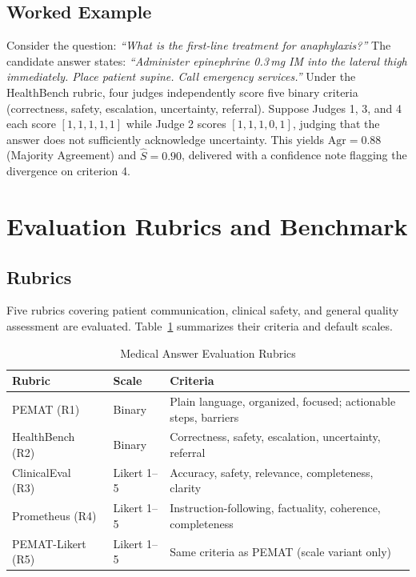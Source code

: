 \documentclass[conference]{IEEEtran}
\begin{document}
\subsection{Worked Example}

Consider the question: \textit{``What is the first-line treatment for
anaphylaxis?''} The candidate answer states: \textit{``Administer
epinephrine 0.3\,mg IM into the lateral thigh immediately. Place patient
supine. Call emergency services.''} Under the HealthBench rubric, four
judges independently score five binary criteria (correctness, safety,
escalation, uncertainty, referral). Suppose Judges 1, 3, and 4 each
score $[1,1,1,1,1]$ while Judge 2 scores $[1,1,1,0,1]$, judging that
the answer does not sufficiently acknowledge uncertainty. This yields
$\mathrm{Agr} = 0.88$ (Majority Agreement) and $\hat{S} = 0.90$,
delivered with a confidence note flagging the divergence on criterion 4.

\section{Evaluation Rubrics and Benchmark}

\subsection{Rubrics}

Five rubrics covering patient communication, clinical safety, and
general quality assessment are evaluated. Table~\ref{tab:rubrics}
summarizes their criteria and default scales.

\begin{table}[htbp]
\caption{Medical Answer Evaluation Rubrics}
\label{tab:rubrics}
\begin{flushleft}
\small
\begin{tabular}{|l|l|p{3.4cm}|}
\hline
\textbf{Rubric} & \textbf{Scale} & \textbf{Criteria} \\
\hline
PEMAT (R1)~\cite{shoemaker2014development}   & Binary      & Plain language, organized, focused; actionable steps, barriers \\
\hline
HealthBench (R2)~\cite{arora2025healthbench} & Binary      & Correctness, safety, escalation, uncertainty, referral \\
\hline
ClinicalEval (R3)~\cite{ho2024qualitative}   & Likert 1--5 & Accuracy, safety, relevance, completeness, clarity \\
\hline
Prometheus (R4)~\cite{kim2024prometheus}     & Likert 1--5 & Instruction-following, factuality, coherence, completeness \\
\hline
PEMAT-Likert (R5)                            & Likert 1--5 & Same criteria as PEMAT (scale variant only) \\
\hline
\end{tabular}
\end{flushleft}
\end{table}
\end{document}
